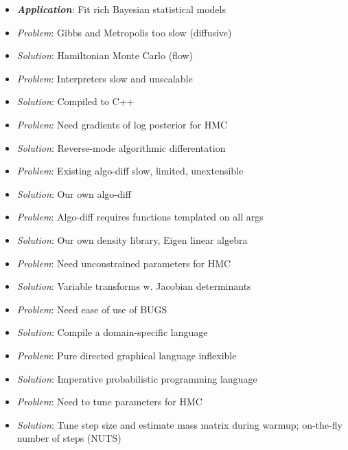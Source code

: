 \documentclass[10pt]{report}
\begin{document}

%
\begin{itemize}
\item {\slshape\bfseries Application}: Fit rich Bayesian statistical models
\end{itemize}
%
\vspace*{2pt}
\begin{itemize}
\item {\slshape Problem}: Gibbs and Metropolis too slow (diffusive) 
\item {\slshape Solution}: Hamiltonian Monte Carlo (flow)
%
\vspace*{8pt}
\item {\slshape Problem}:  Interpreters slow and unscalable
\item {\slshape Solution}: Compiled to C++
%
\vspace*{8pt}
\item {\slshape Problem}:  Need gradients of log posterior for HMC
\item {\slshape Solution}: Reverse-mode algorithmic differentation
\end{itemize}

%
\begin{itemize}
\item {\slshape Problem}:  Existing algo-diff slow, limited, unextensible
\item {\slshape Solution}: Our own algo-diff
%
\vspace*{8pt}
\item {\slshape Problem}:  Algo-diff requires functions templated on
  all args
\item {\slshape Solution}: Our own density library, Eigen linear
 algebra
%
\vspace*{8pt}
\item {\slshape Problem}:  Need unconstrained parameters for HMC
\item {\slshape Solution}: Variable transforms w. Jacobian determinants
%
\end{itemize}

%
\begin{itemize}
\item {\slshape Problem}:  Need ease of use of BUGS
\item {\slshape Solution}: Compile a domain-specific language
%
\vspace*{8pt}
\item {\slshape Problem}:  Pure directed graphical language inflexible
\item {\slshape Solution}: Imperative probabilistic programming
  language
\vspace*{8pt}
\item {\slshape Problem}:  Need to tune parameters for HMC
\item {\slshape Solution}: Tune step size and estimate mass matrix
  during warmup;  on-the-fly number of steps (NUTS)
%
\end{itemize}
\end{document}

